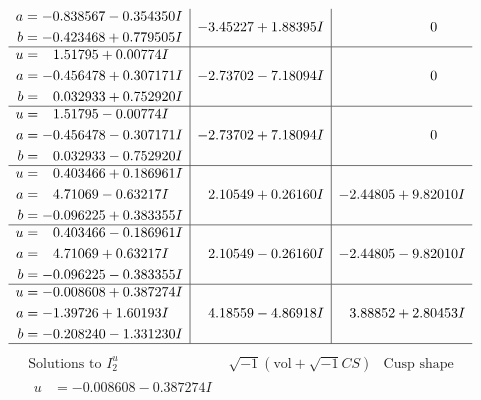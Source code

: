 \documentclass[1p]{elsarticle_modified}
\theoremstyle{definition}
\newcommand{\I}{\sqrt{-1}}
\begin{document}
$$\begin{array}{c|c|c}
\begin{aligned}
a &= -0.838567 - 0.354350 I \\
b &= -0.423468 + 0.779505 I\end{aligned}
 & -3.45227 + 1.88395 I & \phantom{-0.000000 } 0 \\ \hline\begin{aligned}
u &= \phantom{-}1.51795 + 0.00774 I \\
a &= -0.456478 + 0.307171 I \\
b &= \phantom{-}0.032933 + 0.752920 I\end{aligned}
 & -2.73702 - 7.18094 I & \phantom{-0.000000 } 0 \\ \hline\begin{aligned}
u &= \phantom{-}1.51795 - 0.00774 I \\
a &= -0.456478 - 0.307171 I \\
b &= \phantom{-}0.032933 - 0.752920 I\end{aligned}
 & -2.73702 + 7.18094 I & \phantom{-0.000000 } 0 \\ \hline\begin{aligned}
u &= \phantom{-}0.403466 + 0.186961 I \\
a &= \phantom{-}4.71069 - 0.63217 I \\
b &= -0.096225 + 0.383355 I\end{aligned}
 & \phantom{-}2.10549 + 0.26160 I & -2.44805 + 9.82010 I \\ \hline\begin{aligned}
u &= \phantom{-}0.403466 - 0.186961 I \\
a &= \phantom{-}4.71069 + 0.63217 I \\
b &= -0.096225 - 0.383355 I\end{aligned}
 & \phantom{-}2.10549 - 0.26160 I & -2.44805 - 9.82010 I \\ \hline\begin{aligned}
u &= -0.008608 + 0.387274 I \\
a &= -1.39726 + 1.60193 I \\
b &= -0.208240 - 1.331230 I\end{aligned}
 & \phantom{-}4.18559 - 4.86918 I & \phantom{-}3.88852 + 2.80453 I\\
 \hline 
 \end{array}$$\newpage$$\begin{array}{c|c|c}  
\text{Solutions to }I^u_{2}& \I (\text{vol} + \sqrt{-1}CS) & \text{Cusp shape}\\
 \hline 
\begin{aligned}
u &= -0.008608 - 0.387274 I \\

\end{aligned}
\end{array}$$
\end{document}
